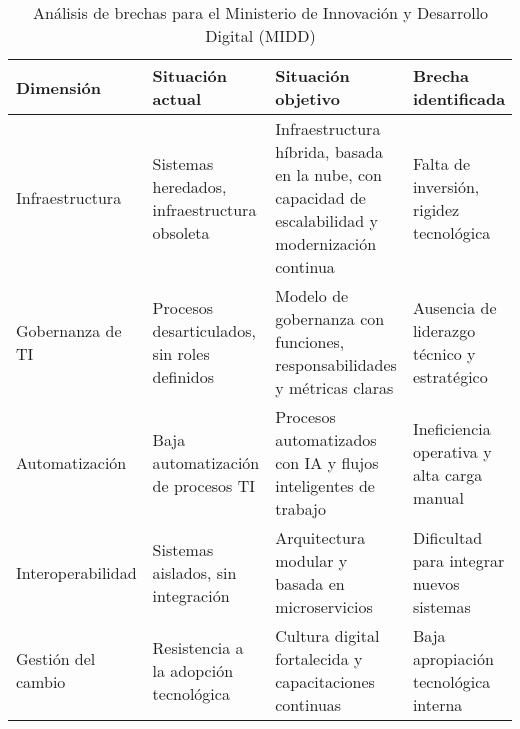 \begin{table}[ht]
    \centering
    \begin{tabular}{|p{}|p{}|p{}|p{}|}
        \hline
        \textbf{Dimensión} & \textbf{Situación actual} & \textbf{Situación objetivo} & \textbf{Brecha identificada} \\ \hline
        Infraestructura & Sistemas heredados, infraestructura obsoleta & Infraestructura híbrida, basada en la nube, con capacidad de escalabilidad y modernización continua & Falta de inversión, rigidez tecnológica \\ \hline
        Gobernanza de TI & Procesos desarticulados, sin roles definidos & Modelo de gobernanza con funciones, responsabilidades y métricas claras & Ausencia de liderazgo técnico y estratégico \\ \hline
        Automatización & Baja automatización de procesos TI & Procesos automatizados con IA y flujos inteligentes de trabajo & Ineficiencia operativa y alta carga manual \\ \hline
        Interoperabilidad & Sistemas aislados, sin integración & Arquitectura modular y basada en microservicios & Dificultad para integrar nuevos sistemas \\ \hline
        Gestión del cambio & Resistencia a la adopción tecnológica & Cultura digital fortalecida y capacitaciones continuas & Baja apropiación tecnológica interna \\ \hline
    \end{tabular}
    \caption{Análisis de brechas para el Ministerio de Innovación y Desarrollo Digital (MIDD)}
    \label{tab:p3-1}
\end{table}





